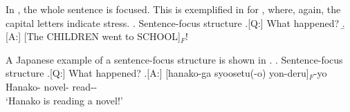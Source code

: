 %
%
%


In ,
the whole sentence is focused.
This is exemplified in \Next[A] for ,
where, again, the capital letters indicate stress.
\ex. Sentence-focus structure
	\a.[Q:] What happened?
	\b.[A:] [The CHILDREN went to SCHOOL]$_{F}$!
	\hfill{\cite[][p.\ 121]{lambrecht94}}

A Japanese example of a sentence-focus structure is shown in \Next[A].
\ex. Sentence-focus structure
	\a.[Q:] What happened? 
	\bg.[A:] [hanako-ga syoosetu(-o) yon-deru]$_{F}$-yo \\
		Hanako- novel- read-- \\
		`Hanako is reading a novel!'

